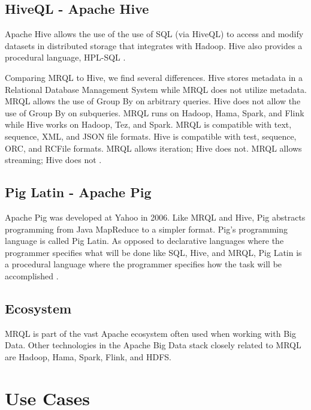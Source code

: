 \documentclass[9pt,twocolumn,twoside]{../../styles/osajnl}
\begin{document}
\subsection{HiveQL - Apache Hive}

Apache Hive allows the use of the use of SQL (via HiveQL) to access and modify datasets in distributed storage that integrates with Hadoop.  Hive also provides a procedural language, HPL-SQL \cite{www-apachehive}.

Comparing MRQL to Hive, we find several differences. Hive stores metadata in a Relational Database Management System while MRQL does not utilize metadata.  MRQL allows the use of Group By on arbitrary queries.  Hive does not allow the use of Group By on subqueries.  MRQL runs on Hadoop, Hama, Spark, and Flink while Hive works on Hadoop, Tez, and Spark.  MRQL is compatible with text, sequence, XML, and JSON file formats.  Hive is compatible with test, sequence, ORC, and RCFile formats.  MRQL allows iteration; Hive does not.  MRQL allows streaming; Hive does not \cite{www-mrqpresent}.



\subsection{Pig Latin - Apache Pig}

Apache Pig was developed at Yahoo in 2006.  Like MRQL and Hive, Pig abstracts programming from Java MapReduce to a simpler format.  Pig's programming language is called Pig Latin.  As opposed to declarative languages where the programmer specifies what will be done like SQL, Hive, and MRQL, Pig Latin is a procedural language where the programmer specifies how the task will be accomplished \cite{www-wikipig}.


\subsection{Ecosystem}

MRQL is part of the vast Apache ecosystem often used when working with Big Data.  Other technologies in the Apache Big Data stack closely related to MRQL are Hadoop, Hama, Spark, Flink, and HDFS.

\section{Use Cases}
\end{document}
